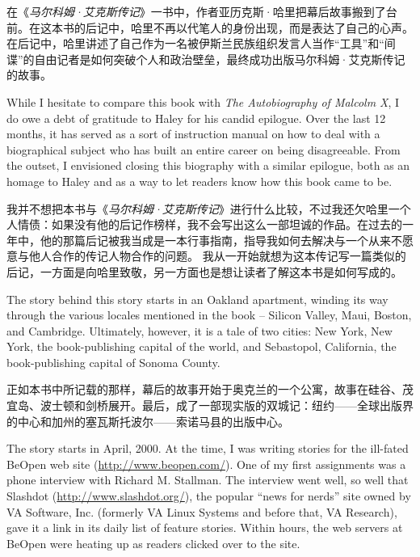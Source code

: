 \ifdefined\chs
在《\textit{马尔科姆·艾克斯传记}》一书中，作者亚历克斯·哈里把幕后故事搬到了台前。在这本书的后记中，哈里不再以代笔人的身份出现，而是表达了自己的心声。在后记中，哈里讲述了自己作为一名被伊斯兰民族组织发言人当作``工具''和``间谍''的自由记者是如何突破个人和政治壁垒，最终成功出版马尔科姆·艾克斯传记的故事。
\fi

\ifdefined\eng
While I hesitate to compare this book with \textit{The Autobiography of Malcolm X}, I do owe a debt of gratitude to Haley for his candid epilogue. Over the last 12 months, it has served as a sort of instruction manual on how to deal with a biographical subject who has built an entire career on being disagreeable. %
From the outset, I envisioned closing this biography with a similar epilogue, both as an homage to Haley and as a way to let readers know how this book came to be.
\fi

\ifdefined\chs
我并不想把本书与《\textit{马尔科姆·艾克斯传记}》进行什么比较，不过我还欠哈里一个人情债：如果没有他的后记作榜样，我不会写出这么一部坦诚的作品。在过去的一年中，他的那篇后记被我当成是一本行事指南，指导我如何去解决与一个从来不愿意与他人合作的传记人物合作的问题。%
我从一开始就想为这本传记写一篇类似的后记，一方面是向哈里致敬，另一方面也是想让读者了解这本书是如何写成的。
\fi

\ifdefined\eng
The story behind this story starts in an Oakland apartment, winding its way through the various locales mentioned in the book -- Silicon Valley, Maui, Boston, and Cambridge. Ultimately, however, it is a tale of two cities: New York, New York, the book-publishing capital of the world, and Sebastopol, California, the book-publishing capital of Sonoma County.
\fi

\ifdefined\chs
正如本书中所记载的那样，幕后的故事开始于奥克兰的一个公寓，故事在硅谷、茂宜岛、波士顿和剑桥展开。最后，成了一部现实版的双城记：纽约——全球出版界的中心和加州的塞瓦斯托波尔——索诺马县的出版中心。
\fi

\ifdefined\eng
The story starts in April, 2000. At the time, I was writing stories for the ill-fated BeOpen web site (\url{http://www.beopen.com/}). One of my first assignments was a phone interview with Richard M. Stallman. The interview went well, so well that Slashdot (\url{http://www.slashdot.org/}), the popular ``news for nerds'' site owned by VA Software, Inc. (formerly VA Linux Systems and before that, VA Research), gave it a link in its daily list of feature stories. Within hours, the web servers at BeOpen were heating up as readers clicked over to the site.
\fi


